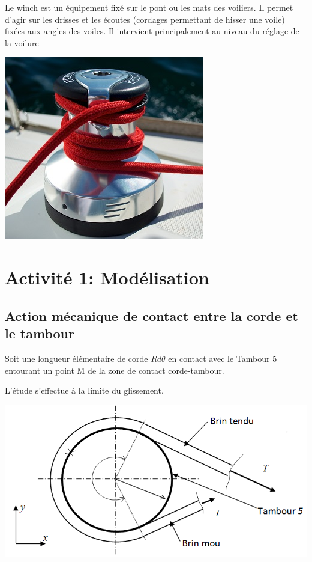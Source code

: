 

\begin{minipage}{0.55\linewidth}
Le winch est un équipement fixé sur le pont ou les mats des voiliers. Il permet d'agir sur les drisses et les écoutes (cordages permettant de hisser une voile) fixées aux angles des voiles. Il intervient principalement au niveau du réglage de la voilure
 \end{minipage}
 \hfill
  \begin{minipage}{0.4\linewidth}
   \centering\includegraphics[width=0.7\linewidth]{img/winch.jpg}
  \end{minipage}
 
\section{Activité 1: Modélisation}

\subsection{Action mécanique de contact entre la corde et le tambour}

\begin{minipage}{0.45\linewidth}
Soit une longueur élémentaire de corde $Rd\theta$ en contact avec le Tambour 5 entourant un point M de la zone de contact corde-tambour.

L'étude s'effectue à la limite du glissement.
 \end{minipage}
 \hfill
  \begin{minipage}{0.53\linewidth}
   \centering\includegraphics[width=\linewidth]{img/corde_tambour.png}
  \end{minipage}

